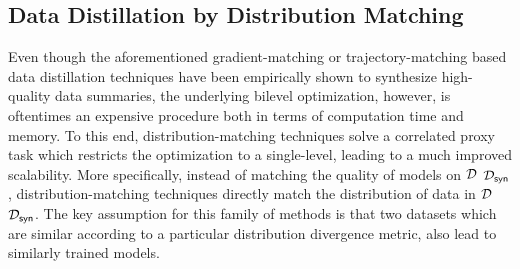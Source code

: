 \documentclass[10pt]{article} %
\begin{document}
\subsection{Data Distillation by Distribution Matching} \label{sec:distr_matching}
Even though the aforementioned gradient-matching or trajectory-matching based data distillation techniques have been empirically shown to synthesize high-quality data summaries, the underlying bilevel optimization, however, is oftentimes an expensive procedure both in terms of computation time and memory. To this end, distribution-matching techniques solve a correlated proxy task which restricts the optimization to a single-level, leading to a much improved scalability. More specifically, instead of matching the quality of models on $\mathcal{D}$ \vs $\mathcal{D}_{\mathsf{syn}}$, distribution-matching techniques directly match the distribution of data in $\mathcal{D}$ \vs $\mathcal{D}_{\mathsf{syn}}$. The key assumption for this family of methods is that two datasets which are similar according to a particular distribution divergence metric, also lead to similarly trained models.
\end{document}
